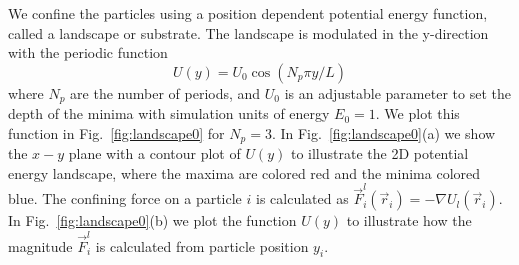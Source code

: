 \documentclass[twocolumn,preprintnumbers,amsmath,amssymb,aps,prx]{revtex4}
\begin{document}
We confine the particles using a position dependent 
potential energy function, called a landscape or substrate.
% 
The landscape is modulated in the y-direction
with the periodic function 
 \begin{equation}
   U(y) = U_0 \cos{(N_p \pi y / L)}
     \label{eq:ysubstrate}
\end{equation}
 where $N_p$ are the number of periods,
 and $U_0$ is an adjustable parameter
 to set the depth of the minima
 with simulation units of energy $E_0 = 1$. 
 We plot this function in 
 Fig.~\ref{fig:landscape0}
 for $N_p = 3$. %
 In Fig.~\ref{fig:landscape0}(a) we show 
 the $x-y$ plane with a contour plot of $U(y)$ %
 to illustrate
 the 2D potential energy landscape,
 where 
 the maxima are colored red and the minima colored blue.
 The confining force on a particle $i$
 is calculated as 
 $\vec{F}^{l}_i(\vec{r}_i) = -\nabla U_l(\vec{r}_i)$.
 In Fig.~\ref{fig:landscape0}(b) we plot the function
 $U(y)$ to illustrate how the magnitude
 $\vec{F}^{l}_i$ is calculated from particle position $y_i$.  
 
\end{document}
